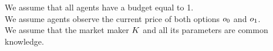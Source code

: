 We assume that all agents have a budget equal to 1.\\

We assume agents observe the current price of both options $o_0$ and $o_1$.\\

We assume that the market maker $K$ and all its parameters are common knowledge.\\

